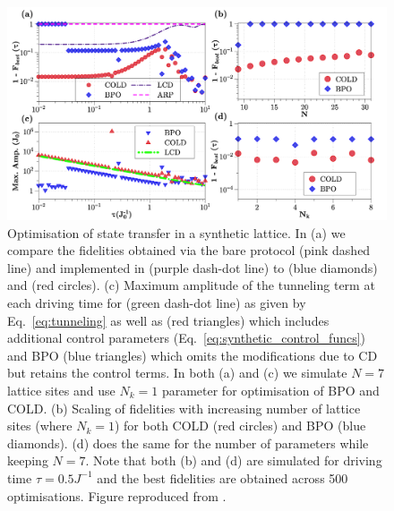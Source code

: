 \begin{figure}[t]
    \centering
    \includegraphics[width=\linewidth]{images_v1/synthetic_lattice.png} \caption[COLD plots for ARP transport in a synthetic lattice]{Optimisation of state transfer in a synthetic lattice.  In (a) we compare the fidelities obtained via the bare  protocol (pink dashed line) and   implemented in \cite{meier_counterdiabatic_2020} (purple dash-dot line) to  (blue diamonds) and  (red circles). (c) Maximum amplitude of the tunneling term at each driving time for  (green dash-dot line) as given by Eq.~\eqref{eq:tunneling} as well as  (red triangles) which includes additional control parameters (Eq.~\eqref{eq:synthetic_control_funcs}) and BPO (blue triangles) which omits the modifications due to CD but retains the control terms. In both (a) and (c) we simulate $N = 7$ lattice sites and use $N_k = 1$ parameter for optimisation of BPO and COLD.  (b) Scaling of fidelities with increasing number of lattice sites (where $N_k = 1$) for both COLD (red circles) and BPO (blue diamonds). (d) does the same for the number of parameters while keeping $N=7$.  Note that both (b) and (d) are simulated for driving time $\tau = 0.5 J^{-1}$ and the best fidelities are obtained across 500 optimisations. Figure reproduced from \cite{cepaite_cold_2023}.}\label{fig:Synthetic}
\end{figure}

